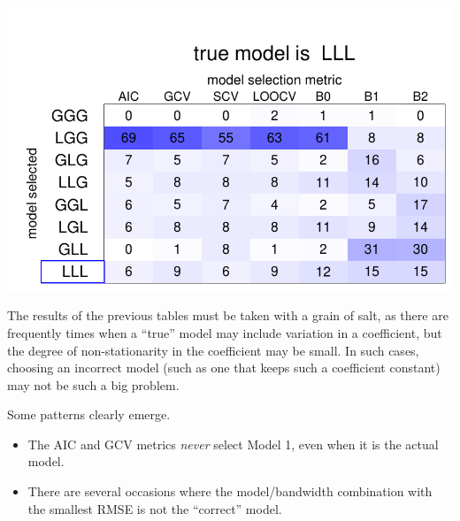 \documentclass{article}\usepackage[]{graphicx}\usepackage[]{color}
\makeatletter
\def\maxwidth{ %
  \ifdim\Gin@nat@width>\linewidth
    \linewidth
  \else
    \Gin@nat@width
  \fi
}
\newenvironment{knitrout}{}{} %
\makeatother
\begin{document}
\begin{knitrout}
\includegraphics[width=\maxwidth]{figure/ModelSelectionTabulations18} 

\end{knitrout}


The results of the previous tables must be taken with a grain of salt, as there are frequently times when a ``true'' model may include variation in a coefficient, but the degree of non-stationarity in the coefficient may be small. In such cases, choosing an incorrect model (such as one that keeps such a coefficient constant) may not be such a big problem. 

Some patterns clearly emerge. 
\begin{itemize}
\item The AIC and GCV metrics \emph{never} select Model 1, even when it is the actual model.
\item There are several occasions where the model/bandwidth combination with the smallest RMSE is not the ``correct'' model.
\end{itemize}
\end{document}
